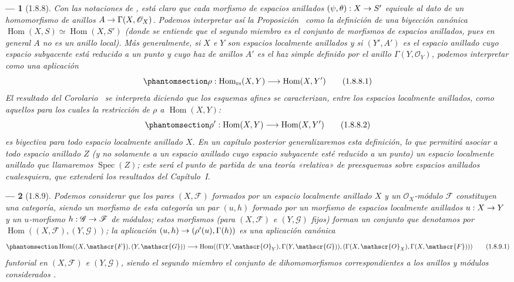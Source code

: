 \documentclass[oneside]{amsart}
\theoremstyle{ega-env-style}
\newtheorem*{env}{---}
\theoremstyle{ega-thm-env-style}
\theoremstyle{ega-defn-env-style}
\def\mathcal{\mathscr}
\def\sh{\mathcal}                   %
\def\Hom{\operatorname{Hom}}
\def\Spec{\operatorname{Spec}}
\renewcommand{\to}{\mathchoice{\longrightarrow}{\rightarrow}{\rightarrow}{\rightarrow}}
\def\isoto{\simeq} %
\newcommand{\oldpage}[2][]{{\marginnote{\normalfont{\textbf{#1}~|~#2}}}\ignorespaces}
\let\EGAOriginalLabel\label
\renewcommand{\label}[1]{\phantomsection\EGAOriginalLabel{#1}}
\begin{document}
\begin{env}[1.8.8]
\label{I.1.8.8}
Con las notaciones de , está claro  que cada morfismo de espacios anillados $(\psi,\theta):X\to S'$ equivale al dato de un homomorfismo de anillos $A\to\Gamma(X,\sh{O}_X)$.
Podemos interpretar así la Proposición~ como la definición de una biyección canónica $\Hom(X,S)\isoto\Hom(X,S')$ (donde se entiende que el segundo miembro es el conjunto de morfismos de espacios anillados, pues en general $A$ no es un anillo local).
Más generalmente, si $X$ e $Y$ son espacios localmente anillados y si $(Y',A')$ es el espacio anillado cuyo espacio subyacente está reducido a un punto y cuyo haz de anillos $A'$ es el haz simple definido por el anillo $\Gamma(Y,\sh{O}_Y)$, podemos interpretar  como una aplicación
\[
  \label{I.1.8.8.1}
  \rho:\Hom_\text{rs}(X,Y)\to\Hom(X,Y')
  \tag{1.8.8.1}
\]
El resultado del Corolario~ se interpreta diciendo que los esquemas afines se caracterizan, entre los espacios localmente anillados, como aquellos para los cuales la restricción de $\rho$ a
$\Hom(X,Y)$:
\[
  \label{I.1.8.8.2}
  \rho':\Hom(X,Y)\to\Hom(X,Y')
  \tag{1.8.8.2}
\]
es \emph{biyectiva} para \emph{todo} espacio localmente anillado $X$.
En un capítulo posterior generalizaremos esta definición, lo que permitirá asociar a \emph{todo} espacio anillado $Z$ (y no solamente a un espacio anillado cuyo espacio subyacente esté reducido a un punto) un espacio localmente anillado que llamaremos $\Spec(Z)$;
este será el punto de partida de una teoría «relativa» de preesquemas sobre espacios anillados cualesquiera, que extenderá los resultados del Capítulo~I.
\end{env}

\begin{env}[1.8.9]
\label{I.1.8.9}
Podemos considerar que los pares $(X,\sh{F})$ formados por un espacio localmente anillado $X$ y un $\sh{O}_X$-módulo $\sh{F}$ constituyen una categoría, siendo un \emph{morfismo} de esta categoría un par $(u,h)$ formado por un morfismo de espacios localmente anillados
\oldpage[II]{221}
$u:X\to Y$ y un $u$-morfismo $h:\sh{G}\to\sh{F}$ de módulos;
estos morfismos (para $(X,\sh{F})$ e $(Y,\sh{G})$ fijos) forman un conjunto que denotamos por $\Hom((X,\sh{F}),(Y,\sh{G}))$;
la aplicación $(u,h)\to(\rho'(u),\Gamma(h))$ es una aplicación canónica
\[
  \label{I.1.8.9.1}
  \Hom((X,\sh{F}),(Y,\sh{G}))\to\Hom((\Gamma(Y,\sh{O}_Y),\Gamma(Y,\sh{G})),(\Gamma(X,\sh{O}_X),\Gamma(X,\sh{F})))
  \tag{1.8.9.1}
\]
\emph{funtorial} en $(X,\sh{F})$ e $(Y,\sh{G})$, siendo el segundo miembro el conjunto de dihomomorfismos correspondientes a los anillos y módulos considerados .
\end{env}
\end{document}
